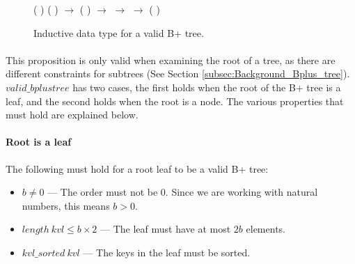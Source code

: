 \begin{figure}
\begin{coqdoccode}
 (  ) (  )  \ensuremath{\rightarrow}\coqdoceol
\coqdocindent{11.00em}
 (  )   \ensuremath{\rightarrow}\coqdoceol
\coqdocindent{11.00em}
  \ensuremath{\rightarrow}  \coqdoceol
\coqdocindent{11.00em}
    \ensuremath{\rightarrow}\coqdoceol
\coqdocindent{11.00em}
   (   )   \coqdoceol
\end{coqdoccode}
\caption{Inductive data type for a valid B+ tree.}
\label{fig:inductive_valid_bplustree}
\end{figure}

\paragraph{}
This proposition is only valid when examining the root of a tree, as there are different constraints for subtrees (See Section \ref{subsec:Background_Bplus_tree}). $valid\_bplustree$ has two cases, the first holds when the root of the B+ tree is a leaf, and the second holds when the root is a node. The various properties that must hold are explained below.

\paragraph{Root is a leaf}
The following must hold for a root leaf to be a valid B+ tree:
\label{valid_root_is_a_leaf}
\begin{itemize}
\item $b \neq 0$ --- The order must not be 0. Since we are working with natural numbers, this means $b > 0$.
\item $length\ kvl \leq b \times 2 $ --- The leaf must have at most $2b$ elements.
\item $kvl\_sorted\ kvl$ --- The keys in the leaf must be sorted.
\end{itemize}

